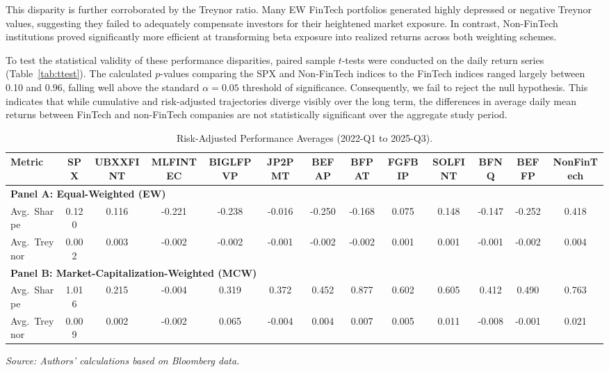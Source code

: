 \documentclass[12pt]{article}
\begin{document}
This disparity is further corroborated by the Treynor ratio. Many EW FinTech portfolios generated highly depressed or negative Treynor values, suggesting they failed to adequately compensate investors for their heightened market exposure. In contrast, Non-FinTech institutions proved significantly more efficient at transforming beta exposure into realized returns across both weighting schemes.

To test the statistical validity of these performance disparities, paired sample $t$-tests were conducted on the daily return series (Table~\ref{tab:ttest}). The calculated $p$-values comparing the SPX and Non-FinTech indices to the FinTech indices ranged largely between 0.10 and 0.96, falling well above the standard $\alpha = 0.05$ threshold of significance. Consequently, we fail to reject the null hypothesis. This indicates that while cumulative and risk-adjusted trajectories diverge visibly over the long term, the differences in average daily mean returns between FinTech and non-FinTech companies are not statistically significant over the aggregate study period.

\begin{table}[htbp]
\centering
\caption{Risk-Adjusted Performance Averages (2022-Q1 to 2025-Q3).}\label{tab:ratios}
\begin{adjustbox}{max width=\textwidth}
\begin{tabular}{lcccccccccccc}
\toprule
Metric & SPX & UBXXFINT & MLFINTEC & BIGLFPVP & JP2PMT & BEFAP & BFPAT & FGFBIP & SOLFINT & BFNQ & BEFFP & NonFinTech \\
\midrule
\multicolumn{13}{l}{\textbf{Panel A: Equal-Weighted (EW)}} \\
Avg.\ Sharpe & 0.120 & 0.116 & -0.221 & -0.238 & -0.016 & -0.250 & -0.168 & 0.075 & 0.148 & -0.147 & -0.252 & 0.418 \\
Avg.\ Treynor & 0.002 & 0.003 & -0.002 & -0.002 & -0.001 & -0.002 & -0.002 & 0.001 & 0.001 & -0.001 & -0.002 & 0.004 \\
\midrule
\multicolumn{13}{l}{\textbf{Panel B: Market-Capitalization-Weighted (MCW)}} \\
Avg.\ Sharpe & 1.016 & 0.215 & -0.004 & 0.319 & 0.372 & 0.452 & 0.877 & 0.602 & 0.605 & 0.412 & 0.490 & 0.763 \\
Avg.\ Treynor & 0.009 & 0.002 & -0.002 & 0.065 & -0.004 & 0.004 & 0.007 & 0.005 & 0.011 & -0.008 & -0.001 & 0.021 \\
\bottomrule
\end{tabular}
\end{adjustbox}
\vspace{2pt}
{\footnotesize \textit{Source: Authors' calculations based on Bloomberg data.}}
\end{table}
\end{document}

